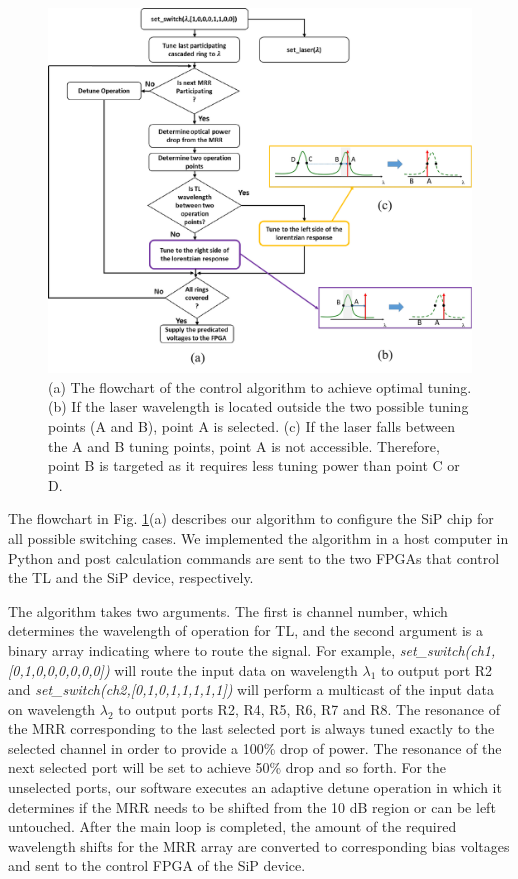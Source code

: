 \begin{figure}[b!]
\begin{center}
\includegraphics[width=13cm]{Chapter3/fig4.pdf}
\caption{(a) The flowchart of the control algorithm to achieve optimal tuning. (b) If the laser wavelength is located outside the two possible tuning points (A and B), point A is selected. (c) If the laser falls between the A and B tuning points, point A is not accessible. Therefore, point B is targeted as it requires less tuning power than point C or D.}
\label{fig4}
\end{center}
\vspace{-0.9cm}
\end{figure}

The flowchart in Fig. \ref{fig4}(a) describes our algorithm to configure the SiP chip for all possible switching cases. We implemented the algorithm in a host computer in Python and post calculation commands are sent to the two FPGAs that control the TL and the SiP device, respectively.



The algorithm takes two arguments. The first is channel number, which determines the wavelength of operation for TL, and the second argument is a binary array indicating where to route the signal. For example, \textit{set\_switch(ch1,[0,1,0,0,0,0,0,0])} will route the input data on wavelength $\lambda_1$  to output port R2 and \textit{set\_switch(ch2,[0,1,0,1,1,1,1,1])} will perform a multicast of the input data on wavelength $\lambda_2$  to output ports R2, R4, R5, R6, R7 and R8. The resonance of the MRR corresponding to the last selected port is always tuned exactly to the selected channel in order to provide a 100\% drop of power. The resonance of the next selected port will be set to achieve 50\% drop and so forth. For the unselected ports, our software executes an adaptive detune operation in which it determines if the MRR needs to be shifted from the 10 dB region or can be left untouched. After the main loop is completed, the amount of the required wavelength shifts for the MRR array are converted to corresponding bias voltages and sent to the control FPGA of the SiP device.

